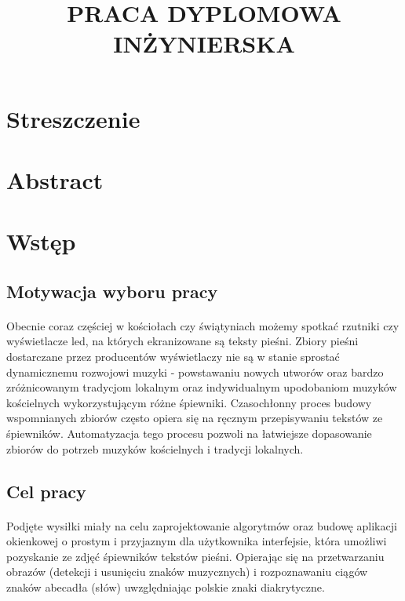 \documentclass[a4paper,12pt]{article}
\begin{document}
\title{PRACA DYPLOMOWA INŻYNIERSKA}
\maketitle

\newpage
\section*{Streszczenie}
\section*{Abstract}

\newpage 
\section{Wstęp}
	\subsection{Motywacja wyboru pracy}
 		\paragraph{\noindent} 
 		Obecnie coraz częściej w kościołach czy świątyniach możemy spotkać rzutniki czy wyświetlacze led, na których ekranizowane są teksty pieśni.
		Zbiory pieśni dostarczane przez producentów wyświetlaczy nie są w stanie sprostać dynamicznemu rozwojowi muzyki - powstawaniu nowych utworów
		oraz bardzo zróżnicowanym tradycjom lokalnym oraz indywidualnym upodobaniom muzyków kościelnych wykorzystującym różne śpiewniki.
		Czasochłonny proces budowy wspomnianych zbiorów często opiera się na ręcznym przepisywaniu tekstów ze śpiewników.
		Automatyzacja tego procesu pozwoli na łatwiejsze dopasowanie zbiorów do potrzeb muzyków kościelnych i tradycji lokalnych. 

	\subsection{Cel pracy}
		\paragraph{\noindent}
		Podjęte wysiłki miały na celu zaprojektowanie algorytmów oraz budowę aplikacji okienkowej o prostym i przyjaznym dla użytkownika interfejsie, która umożliwi pozyskanie ze zdjęć śpiewników tekstów pieśni.
		Opierając się na przetwarzaniu obrazów (detekcji i usunięciu znaków muzycznych) i rozpoznawaniu ciągów znaków abecadła (słów) uwzględniając polskie znaki diakrytyczne.
\end{document}

